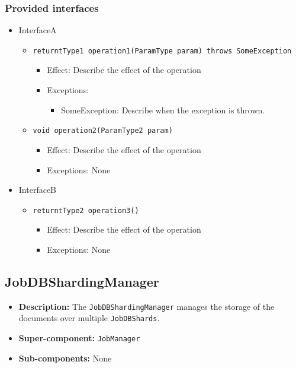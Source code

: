 \documentclass[a4paper,10pt]{article}
\begin{document}
\subsubsection*{Provided interfaces}
\begin{itemize}
    \item InterfaceA
    \begin{itemize}
        \item \texttt{returntType1 operation1(ParamType param) throws SomeException}
        \begin{itemize}
            \item Effect: Describe the effect of the operation
            \item Exceptions:
            \begin{itemize}
                \item SomeException: Describe when the exception is thrown.
            \end{itemize}
		\end{itemize}
        \item \texttt{void operation2(ParamType2 param)}
        \begin{itemize}
            \item Effect: Describe the effect of the operation
            \item Exceptions: None
        \end{itemize}
    \end{itemize}

    \item InterfaceB
    \begin{itemize}
        \item \texttt{returntType2 operation3()}
        \begin{itemize}
            \item Effect: Describe the effect of the operation
            \item Exceptions: None
        \end{itemize}
    \end{itemize}
\end{itemize}

\subsection{JobDBShardingManager}
\begin{itemize}
    \item \textbf{Description:} The \texttt{JobDBShardingManager} manages the storage of the documents over multiple \texttt{JobDBShards}.
    \item \textbf{Super-component:} \texttt{JobManager}
    \item \textbf{Sub-components:} None
\end{itemize}
\end{document}
